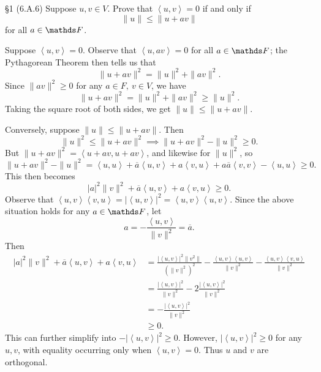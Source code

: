 \documentclass{homework}
\begin{document}
\begin{problem}{\S 1}
  (6.A.6) Suppose $u,v\in V$. Prove that $\left<u,v \right>=0$ if and only if \[
    \|u\|\le \|u+av\|
  \] for all $a\in \F$.
\end{problem}
\begin{solution}
  Suppose $\left<u,v \right>=0$. Observe that $\left<u,av \right> =0$ for all $a\in \F$; the
  Pythagorean Theorem then tells us that \[
    \|u+av\|^2=\|u\|^2+\|av\|^2
  .\] Since $\|av\|^2\ge 0$ for any $a\in F,\ v\in V$, we have \[
    \|u+av\|^2=\|u\|^2+\|av\|^2\ge \|u\|^2
  .\] Taking the square root of both sides, we get $\|u\|\le \|u+av\|$.

  Conversely, suppose $\|u\|\le \|u+av\|$. Then \[
    \|u\|^2\le \|u+av\|^2 \implies \|u+av\|^2-\|u\|^2\ge 0  
  .\] But $\|u+av\|^2=\left<u+av,u+av \right> $, and likewise for $\|u\|^2$, so \[
    \|u+av\|^2-\|u\|^2=\left<u,u \right> +\overline{a}\left<u,v \right> +a\left<v,u \right>
    +a\overline{a}\left<v,v \right> -\left<u,u \right> \ge 0
  .\] This then becomes \[
    \left| a \right| ^2\|v\|^2+\overline{a}\left<u,v \right> +a\left<v,u \right> \ge 0
  .\] Observe that $\left<u,v \right> \left<v,u \right> =\left| \left<u,v \right>  \right|
  ^2=\left<u,v \right> \left<u,v \right> $.  Since the above situation holds for any $a\in \F$, let
  \[
    a=-\frac{\left<u,v \right> }{\|v\|^2}=\overline{a}
  .\] Then
  \begin{align*}
    \left| a \right| ^2\|v\|^2+\overline{a}\left<u,v \right> +a\left<v,u \right> &= \frac{\left|
    \left<u,v \right>  \right| ^2\|v^2\|}{(\|v\|^2)^2}-\frac{\left<u,v \right> \left<u,v \right>
  }{\|v\|^2}-\frac{\left<u,v \right> \left<v,u \right> }{\|v\|^2}\\
  &= \frac{\left| \left<u,v \right>  \right|^2 }{\|v\|^2}-2 \frac{\left| \left<u,v \right>  \right|
  ^2}{\|v\|^2}\\
  &= -\frac{\left| \left<u,v \right>  \right| ^2}{\|v\|^2}\\
  &\ge 0
  .\end{align*}
  This can further simplify into $-\left| \left<u,v \right>  \right| ^2\ge 0$. However, $\left|
  \left<u,v \right>  \right| ^2\ge 0$ for any $u,v$, with equality occurring only when $\left<u,v
  \right> =0$. Thus $u$ and $v$ are orthogonal.
\end{solution}
\end{document}
